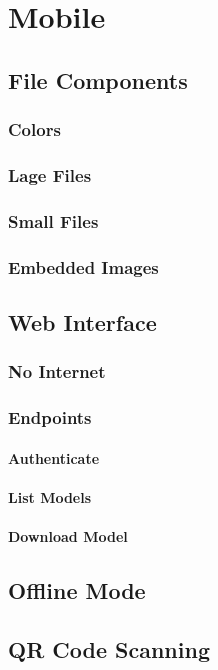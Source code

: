 
\section{Mobile}

    \subsection{File Components}

        \subsubsection{Colors}

        \subsubsection{Lage Files}

        \subsubsection{Small Files}

        \subsubsection{Embedded Images}

    \subsection{Web Interface}

        \subsubsection{No Internet}

        \subsubsection{Endpoints}

            \paragraph{Authenticate}

            \paragraph{List Models}

            \paragraph{Download Model}
        
    \subsection{Offline Mode}

    \subsection{QR Code Scanning}
